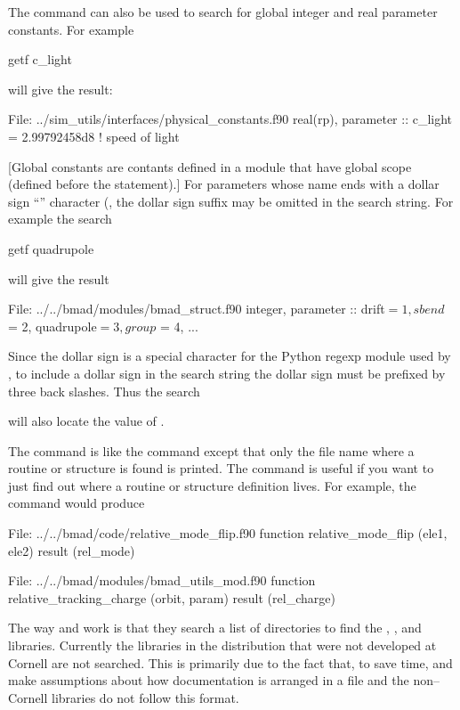 {{{{{{The  command can also be used to search for global integer and real parameter constants. For example
\begin{example}
  getf c_light
\end{example}
will give the result:
\begin{example}
  File: ../sim_utils/interfaces/physical_constants.f90
      real(rp), parameter :: c_light = 2.99792458d8              ! speed of light
\end{example}
[Global constants are contants defined in a module that have global scope (defined before the
 statement).] For parameters whose name ends with a dollar sign ``\vn{\$}'' character
(, the dollar sign suffix may be omitted in the search string. For example
the search
\begin{example}
  getf quadrupole
\end{example}
will give the result
\begin{example}
  File: ../../bmad/modules/bmad_struct.f90
      integer, parameter :: drift$ = 1, sbend$ = 2, quadrupole$ = 3, group$ = 4, ...
\end{example}
Since the dollar sign is a special character for the Python regexp module used by , to
include a dollar sign in the search string the dollar sign must be prefixed by three back
slashes. Thus the search
will also locate the value of .

The  command is like the  command except that only
the file name where a routine or structure is found is printed.
The  command is useful if you
want to just find out where a routine or structure definition lives.
For example, the  command would produce
\begin{example}
  File: ../../bmad/code/relative_mode_flip.f90
      function relative_mode_flip (ele1, ele2) result (rel_mode)

  File: ../../bmad/modules/bmad_utils_mod.f90
      function relative_tracking_charge (orbit, param) result (rel_charge)
\end{example}

The way  and  work is that they search a list of
directories to find the , , and 
libraries. Currently the libraries in the \bmad distribution that were
not developed at Cornell are not searched. This is primarily due to
the fact that, to save time,  and  make assumptions
about how documentation is arranged in a file and the non--Cornell libraries 
do not follow this format.

}}}}}}
